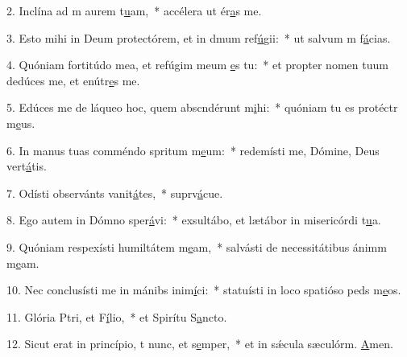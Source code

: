 2. Inclína ad m aurem t\uline{u}am,~* accélera ut ér\uline{a}s me.\par 
3. Esto mihi in Deum protectórem, et in dmum ref\uline{ú}gii:~* ut salvum m f\uline{á}cias.\par 
4. Quóniam fortitúdo mea, et refúgim meum \uline{e}s tu:~* et propter nomen tuum dedúces me, et enútr\uline{e}s me.\par 
5. Edúces me de láqueo hoc, quem abscndérunt m\uline{i}hi:~* quóniam tu es protéctr m\uline{e}us.\par 
6. In manus tuas comméndo spritum m\uline{e}um:~* redemísti me, Dómine, Deus vert\uline{á}tis.\par 
7. Odísti observánts vanit\uline{á}tes,~* suprv\uline{á}cue.\par 
8. Ego autem in Dómno sper\uline{á}vi:~* exsultábo, et lætábor in misericórdi t\uline{u}a.\par 
9. Quóniam respexísti humiltátem m\uline{e}am,~* salvásti de necessitátibus ánimm m\uline{e}am.\par 
10. Nec conclusísti me in mánibs inim\uline{í}ci:~* statuísti in loco spatióso peds m\uline{e}os.\par 
11. Glória Ptri, et F\uline{í}lio,~* et Spirítu S\uline{a}ncto.\par 
12. Sicut erat in princípio, t nunc, et s\uline{e}mper,~* et in sǽcula sæculórm. \uline{A}men.\par 
